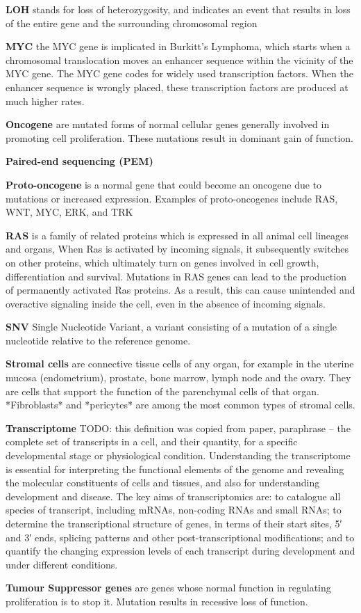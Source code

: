 \textbf{LOH} stands for loss of heterozygosity, and indicates an event that results in loss of the entire gene and the surrounding chromosomal region

\textbf{MYC} the MYC gene is implicated in Burkitt's Lymphoma, which starts when a chromosomal translocation moves an enhancer sequence within the vicinity of the MYC gene. The MYC gene codes for widely used transcription factors. When the enhancer sequence is wrongly placed, these transcription factors are produced at much higher rates.

\textbf{Oncogene} are mutated forms of normal cellular genes generally involved in promoting cell proliferation.  These mutations result in dominant gain of function.

\textbf{Paired-end sequencing (PEM)}

\textbf{Proto-oncogene} is a normal gene that could become an oncogene due to mutations or increased expression. Examples of proto-oncogenes include RAS, WNT, MYC, ERK, and TRK

\textbf{RAS} is a family of related proteins which is expressed in all animal cell lineages and organs, When Ras is activated by incoming signals, it subsequently switches on other proteins, which ultimately turn on genes involved in cell growth, differentiation and survival. Mutations in RAS genes can lead to the production of permanently activated Ras proteins. As a result, this can cause unintended and overactive signaling inside the cell, even in the absence of incoming signals.

\textbf{SNV} Single Nucleotide Variant, a variant consisting of a mutation of a single nucleotide relative to the reference genome.

\textbf{Stromal cells} are connective tissue cells of any organ, for example in the uterine mucosa (endometrium), prostate, bone marrow, lymph node and the ovary. They are cells that support the function of the parenchymal cells of that organ. *Fibroblasts* and *pericytes* are among the most common types of stromal cells.

\textbf{Transcriptome} TODO: this definition was copied from paper, paraphrase -- the complete set of transcripts in a cell, and their quantity, for a specific developmental stage or physiological condition. Understanding the transcriptome is essential for interpreting the functional elements of the genome and revealing the molecular constituents of cells and tissues, and also for understanding development and disease. The key aims of transcriptomics are: to catalogue all species of transcript, including mRNAs, non-coding RNAs and small RNAs; to determine the transcriptional structure of genes, in terms of their start sites, 5′ and 3′ ends, splicing patterns and other post-transcriptional modifications; and to quantify the changing expression levels of each transcript during development and under different conditions.

\textbf{Tumour Suppressor genes} are genes whose normal function in regulating proliferation is to stop it. Mutation results in recessive loss of function.
